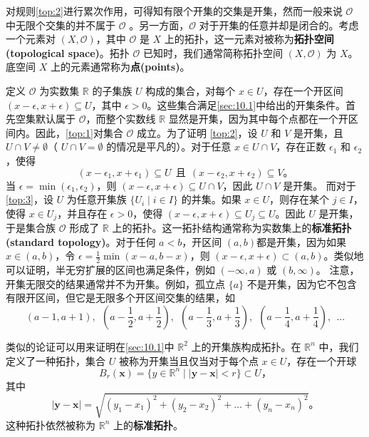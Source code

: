 	对规则\ref{top:2}进行累次作用，可得知有限个开集的交集是开集，然而一般来说 $\mathcal{O}$ 中无限个交集的并不属于 $\mathcal{O}$ 。另一方面，$\mathcal{O}$ 对于开集的任意并却是闭合的。考虑一个元素对 $(X,\mathcal{O} )$，其中 $\mathcal{O}$ 是 $X$ 上的拓扑，这一元素对被称为\textbf{拓扑空间(topological space)}。拓扑 $\mathcal{O}$ 已知时，我们通常简称拓扑空间 $(X,\mathcal{O} )$ 为 $X$。底空间 $X$ 上的元素通常称为\textbf{点(points)}。

\begin{eg}\label{eg:10.1}
 	定义 $\mathcal{O}$ 为实数集 $\mathbb{R}$ 的子集族 $U$ 构成的集合，对每个 $x\in U$，存在一个开区间 $(x-\epsilon ,x+\epsilon )\subseteq U$，其中 $\epsilon  >0$。这些集合满足\ref{sec:10.1}中给出的开集条件。首先空集默认属于 $\mathcal{O}$，而整个实数线 $\mathbb{R}$ 显然是开集，因为其中每个点都在一个开区间内。因此，\ref{top:1}对集合 $\mathcal{O}$ 成立。为了证明 \ref{top:2}，设 $U$ 和 $V$ 是开集，且 $U\cap V\neq \emptyset $（ $U\cap V=\emptyset $ 的情况是平凡的）。对于任意 $x\in U\cap V$，存在正数 $\epsilon _{1}$ 和 $\epsilon _{2}$，使得
\begin{equation*}
(x-\epsilon _{1} ,x+\epsilon _{1} )\subseteq U\ \ \text{且} \ \ (x-\epsilon _{2} ,x+\epsilon _{2} )\subseteq V。
\end{equation*}
当 $\epsilon =\min (\epsilon _{1} ,\epsilon _{2} )$，则 $(x-\epsilon ,x+\epsilon )\subseteq U\cap V$，因此 $U\cap V$ 是开集。
	而对于\ref{top:3}，设 $U$ 为任意开集族 $\{U_{i} \mid i\in I\}$ 的并集。如果 $x\in U$，则存在某个 $j\in I$，使得 $x\in U_{j}$，并且存在 $\epsilon  >0$，使得 $(x-\epsilon ,x+\epsilon )\subseteq U_{j} \subseteq U$。因此 $U$ 是开集，于是集合族 $\mathcal{O}$ 形成了 $\mathbb{R}$ 上的拓扑。这一拓扑结构通常称为实数集上的\textbf{标准拓扑(standard topology)}。对于任何 $a< b$，开区间 $(a,b)$都是开集，因为如果 $x\in (a,b)$，令 $\epsilon =\frac{1}{2}\min (x-a,b-x)$，则 $(x-\epsilon ,x+\epsilon )\subset (a,b)$。类似地可以证明，半无穷扩展的区间也满足条件，例如 $(-\infty ,a)$ 或 $(b,\infty )$。
	注意，开集无限交的结果通常并不为开集。例如，孤立点 $\{a\}$ 不是开集，因为它不包含有限开区间，但它是无限多个开区间交集的结果，如
\begin{equation*}
(a-1,a+1),\ \ (a-\frac{1}{2} ,a+\frac{1}{2} ),\ \ (a-\frac{1}{3} ,a+\frac{1}{3} ),\ \ (a-\frac{1}{4} ,a+\frac{1}{4} ),\ \ \dotsc 
\end{equation*}
\end{eg}
类似的论证可以用来证明在\ref{sec:10.1}中 $\mathbb{R}^{2}$ 上的开集族构成拓扑。在 $\mathbb{R}^{n}$ 中，我们定义了一种拓扑，集合 $U$ 被称为开集当且仅当对于每个点 $x\in U$，存在一个开球
\begin{equation*}
B_{r} (\mathbf{x} )=\{y\in \mathbb{R}^{n} \mid | \mathbf{y} -\mathbf{x}| < r\}\subset U，
\end{equation*}
其中
\begin{equation*}
|\mathbf{y} -\mathbf{x} |=\sqrt{(y_{1} -x_{1} )^{2} +(y_{2} -x_{2} )^{2} +\dotsc +(y_{n} -x_{n} )^{2}} 。
\end{equation*}
这种拓扑依然被称为 $\mathbb{R}^{n}$ 上的\textbf{标准拓扑}。	

